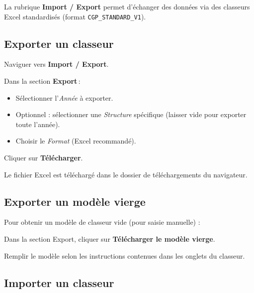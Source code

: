 La rubrique \textbf{Import / Export} permet d'\'echanger des donn\'ees via des classeurs Excel standardis\'es (format \texttt{CGP\_STANDARD\_V1}).


\subsection{Exporter un classeur}

\begin{steps}
  \item Naviguer vers \textbf{Import / Export}.
  \item Dans la section \textbf{Export}\,:
    \begin{itemize}
      \item S\'electionner l'\textit{Ann\'ee} \`a exporter.
      \item Optionnel : s\'electionner une \textit{Structure} sp\'ecifique (laisser vide pour exporter toute l'ann\'ee).
      \item Choisir le \textit{Format} (Excel recommand\'e).
    \end{itemize}
  \item Cliquer sur \textbf{T\'el\'echarger}.
  \item Le fichier Excel est t\'el\'echarg\'e dans le dossier de t\'el\'echargements du navigateur.
\end{steps}

\subsection{Exporter un mod\`ele vierge}

Pour obtenir un mod\`ele de classeur vide (pour saisie manuelle) :

\begin{steps}
  \item Dans la section Export, cliquer sur \textbf{T\'el\'echarger le mod\`ele vierge}.
  \item Remplir le mod\`ele selon les instructions contenues dans les onglets du classeur.
\end{steps}

\subsection{Importer un classeur}

